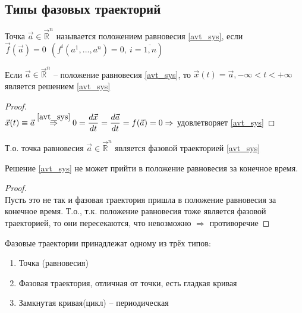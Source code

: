 		\subsection{Типы фазовых траекторий}
		
		\begin{definition}
			Точка $\vec{a} \in \vec{\mathbb{R}}^n$ называется положением равновесия \eqref{avt_sys}, если \\ $ \vec{f}(\vec{a}) = 0 \ \ (f^i(a^1, ..., a^n) = 0, \ i = \overline{1, n} )$
		\end{definition}
	
		\begin{proposition}
			Если $ \vec{a} \in \vec{\mathbb{R}}^n $ -- положение равновесия \eqref{avt_sys}, то $ \vec{x}(t) = \vec{a}, -\infty < t < + \infty$ является решением \eqref{avt_sys}
		\end{proposition}
	
		\begin{proof}
			\ \\
			$\vec{x}(t) \equiv \vec{a} \overset{\eqref{avt_sys}}{\Rightarrow} 0 = \dfrac{d\vec{x}}{dt} = \dfrac{d \vec{a}}{dt} = f(\vec{a}) = 0 \Rightarrow$ удовлетворяет \eqref{avt_sys}
		\end{proof}
		\noindent Т.о. точка равновесия $ \vec{a} \in \vec{\mathbb{R}}^n$ является фазовой траекторией \eqref{avt_sys}
		
		\begin{corollary}
			Решение \eqref{avt_sys} не может прийти в положение равновесия за конечное время.
		\end{corollary}
	
		\begin{proof}
			\ \\
			Пусть это не так и фазовая траектория пришла в положение равновесия за конечное время. Т.о., т.к. положение равновесия тоже является фазовой траекторией, то они пересекаются, что невозможно $\Rightarrow$ противоречие 
		\end{proof}
	
		\begin{theorem}
			Фазовые траектории принадлежат одному из трёх типов:
			\begin{enumerate}
				\item Точка (равновесия)
				\item Фазовая траектория, отличная от точки, есть гладкая кривая
				\item Замкнутая кривая(цикл) -- периодическая
			\end{enumerate}
		\end{theorem}
	
